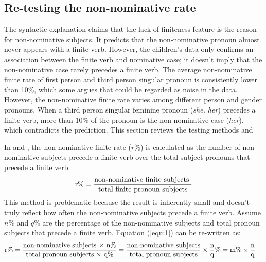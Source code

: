 \subsection{Re-testing the non-nominative rate}
The syntactic explanation claims that the lack of finiteness feature is the reason for non-nominative subjects. It predicts that the non-nominative pronoun almost never appears with a finite verb. However, the children's data only confirms an association between the finite verb and nominative case; it doesn't imply that the non-nominative case rarely precedes a finite verb. The average non-nominative finite rate of first person and third person singular pronoun is consistently lower than 10\%, which some argues that could be regarded as noise in the data. However, the non-nominative finite rate varies among different person and gender pronouns. When a third person singular feminine pronoun (\textit{she, her}) precedes a finite verb, more than 10\% of the pronoun is the non-nominative case (\textit{her}), which contradicts the prediction. This section reviews the testing methods and 

In \cite{schutze1996subject} and \cite{pine2005testing}, the non-nominative finite rate ($r\%$) is calculated as the number of non-nominative subjects precede a finite verb over the total subject pronouns that precede a finite verb.
\begin{equation}
\label{equ:1}
\centering
     \text{r\%} = \displaystyle\frac{\text{non-nominative finite subjects }}{\text{total finite pronoun subjects}}
\end{equation}
This method is problematic because the result is inherently small and doesn't truly reflect how often the non-nominative subjects precede a finite verb. Assume $n\%$ and $q\%$ are the percentage of the non-nominative subjects and total pronoun subjects that precede a finite verb. Equation (\ref{equ:1}) can be re-written as: 
\begin{align}
    \label{equ:2}
    \centering
   \text{r\%} & =  \displaystyle\frac{\text{non-nominative subjects $\times$ n\%}}{\text{total pronoun subjects $\times$ q\%}} =  \displaystyle\frac{\text{non-nominative subjects}}{\text{total pronoun subjects}} \times \displaystyle\frac{\text{n}}{\text{q}}\% = \text{m\%} \times \displaystyle\frac{\text{n}}{\text{q}}
\end{align}

